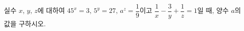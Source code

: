 실수 $x$, $y$, $z$에 대하여 $45^x=3$, $5^y=27$, $a^z=\dfrac{1}{9}$이고 $\dfrac{1}{x}-\dfrac{3}{y}+\dfrac{1}{z}=1$일 때, 양수 $a$의 값을 구하시오.
